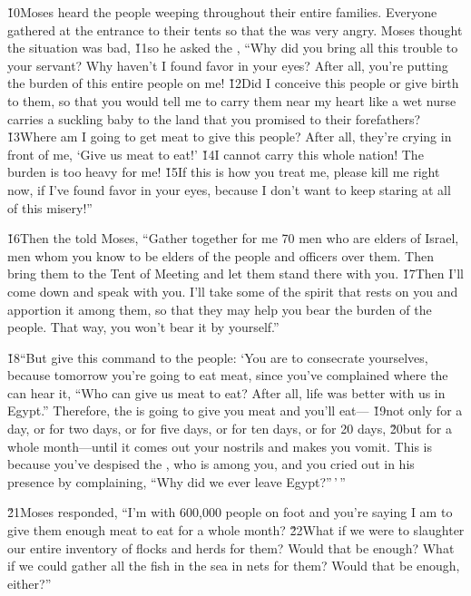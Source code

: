 \v{10}Moses heard the people weeping throughout their entire families. Everyone gathered at the entrance to their tents so that the  was very angry. Moses thought the situation was bad, \v{11}so he asked the , ``Why did you bring all this trouble to your servant? Why haven't I found favor in your eyes? After all, you're putting the burden of this entire people on me! \v{12}Did I conceive this people or give birth to them, so that you would tell me to carry them near my heart like a wet nurse carries a suckling baby to the land that you promised to their forefathers? \v{13}Where am I going to get meat to give this people? After all, they're crying in front of me, `Give us meat to eat!' \v{14}I cannot carry this whole nation! The burden is too heavy for me! \v{15}If this is how you treat me, please kill me right now, if I've found favor in your eyes, because I don't want to keep staring at all of this misery!''

\v{16}Then the  told Moses, ``Gather together for me 70 men who are elders of Israel, men whom you know to be elders of the people and officers over them. Then bring them to the Tent of Meeting and let them stand there with you. \v{17}Then I'll come down and speak with you. I'll take some of the spirit that rests on you and apportion it among them, so that they may help you bear the burden of the people. That way, you won't bear it by yourself.''

\v{18}``But give this command to the people: `You are to consecrate yourselves, because tomorrow you're going to eat meat, since you've complained where the  can hear it, ``Who can give us meat to eat? After all, life was better with us in Egypt.'' Therefore, the  is going to give you meat and you'll eat--- \v{19}not only for a day, or for two days, or for five days, or for ten days, or for 20 days, \v{20}but for a whole month---until it comes out your nostrils and makes you vomit. This is because you've despised the , who is among you, and you cried out in his presence by complaining, ``Why did we ever leave Egypt?''\,'\,''

\v{21}Moses responded, ``I'm with 600,000 people on foot and you're saying I am to give them enough meat to eat for a whole month? \v{22}What if we were to slaughter our entire inventory of flocks and herds for them? Would that be enough? What if we could gather all the fish in the sea in nets for them? Would that be enough, either?''

